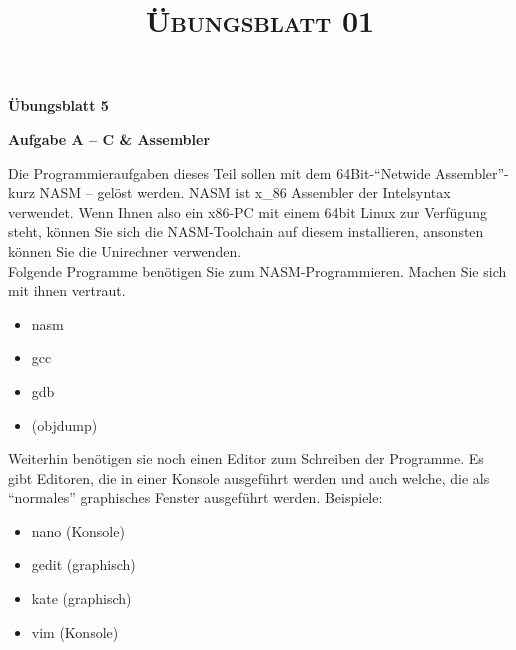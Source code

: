 \documentclass[paper=a4,fontsize=11pt]{scrartcl}%
\title{	
\normalfont \normalsize 
\textsc{Übungsblatt 01}
}
\numberwithin{equation}{section}
\begin{document}
\vspace*{-1cm}
\begin{center}
\Large{\textbf{Übungsblatt 5}}
\end{center}

\begin{center}\Large{\textbf{Aufgabe A -- C \& Assembler}}\end{center}
Die Programmieraufgaben dieses Teil sollen mit dem 64Bit-\enquote{Netwide Assembler}- kurz NASM -- gelöst werden. NASM ist x\_86 Assembler der Intelsyntax verwendet. Wenn Ihnen also ein x86-PC mit einem
64bit Linux zur Verfügung steht, können Sie sich die NASM-Toolchain auf diesem installieren, ansonsten
können Sie die Unirechner verwenden.\\
Folgende Programme benötigen Sie zum NASM-Programmieren. Machen Sie sich mit ihnen vertraut.
	\begin{itemize}
		\item nasm
		\item gcc
		\item gdb
		\item (objdump)
	\end{itemize}
Weiterhin benötigen sie noch einen Editor zum Schreiben der Programme. Es gibt Editoren, die in einer
Konsole ausgeführt werden und auch welche, die als \enquote{normales} graphisches Fenster ausgeführt werden.
Beispiele:
\begin{itemize}
	\item nano (Konsole)
	\item gedit (graphisch)
	\item kate (graphisch)
	\item vim (Konsole)
\end{itemize}
\end{document}
